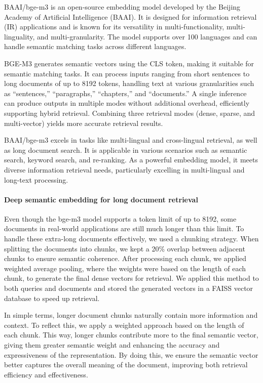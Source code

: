 \documentclass[twoside]{article}
\begin{document}
BAAI/bge-m3 is an open-source embedding model developed by the Beijing Academy of Artificial Intelligence (BAAI). It is designed for information retrieval (IR) applications 
and is known for its versatility in multi-functionality, multi-linguality, and multi-granularity. The model supports over 100 languages and can handle semantic matching tasks 
across different languages.

BGE-M3 generates semantic vectors using the CLS token, making it suitable for semantic matching tasks. It can process inputs ranging from short sentences to long documents of 
up to 8192 tokens, handling text at various granularities such as ``sentences,'' ``paragraphs,'' ``chapters,'' and ``documents.'' A single inference can produce outputs in multiple modes 
without additional overhead, efficiently supporting hybrid retrieval. Combining three retrieval modes (dense, sparse, and multi-vector) yields more accurate retrieval results.

BAAI/bge-m3 excels in tasks like multi-lingual and cross-lingual retrieval, as well as long document search. It is applicable in various scenarios such as semantic search, keyword 
search, and re-ranking. As a powerful embedding model, it meets diverse information retrieval needs, particularly excelling in multi-lingual and long-text processing.

\paragraph*{Deep semantic embedding for long document retrieval}
Even though the bge-m3 model supports a token limit of up to 8192, some documents in real-world applications are still much longer than this limit. To handle these extra-long documents 
effectively, we used a chunking strategy. When splitting the documents into chunks, we kept a 20\% overlap between adjacent chunks to ensure semantic coherence. After processing each chunk, 
we applied weighted average pooling, where the weights were based on the length of each chunk, to generate the final dense vectors for retrieval. We applied this method to both queries and 
documents and stored the generated vectors in a FAISS vector database to speed up retrieval.

In simple terms, longer document chunks naturally contain more information and context. To reflect this, we apply a weighted approach based on the length of each chunk. This way, longer chunks 
contribute more to the final semantic vector, giving them greater semantic weight and enhancing the accuracy and expressiveness of the representation. By doing this, we ensure the semantic vector 
better captures the overall meaning of the document, improving both retrieval efficiency and effectiveness.
\end{document}
